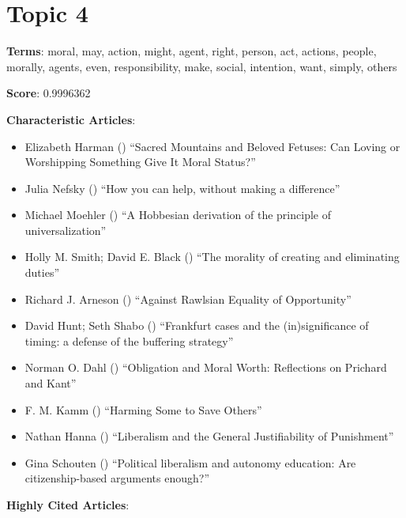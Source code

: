 \documentclass[
  10pt,
  letterpaper,
  DIV=11,
  numbers=noendperiod,
  twoside]{scrartcl}
\providecommand{\tightlist}{%
  \setlength{\itemsep}{0pt}\setlength{\parskip}{0pt}}\usepackage{longtable,booktabs,array}
\begin{document}
\section{Topic 4}\label{topic-4}

\textbf{Terms}: moral, may, action, might, agent, right, person, act,
actions, people, morally, agents, even, responsibility, make, social,
intention, want, simply, others

\textbf{Score}: 0.9996362

\textbf{Characteristic Articles}:

\begin{itemize}
\tightlist
\item
  Elizabeth Harman () ``Sacred
  Mountains and Beloved Fetuses: Can Loving or Worshipping Something
  Give It Moral Status?''
\item
  Julia Nefsky () ``How you can
  help, without making a difference''
\item
  Michael Moehler () ``A
  Hobbesian derivation of the principle of universalization''
\item
  Holly M. Smith; David E. Black
  () ``The morality of creating
  and eliminating duties''
\item
  Richard J. Arneson () ``Against
  Rawlsian Equality of Opportunity''
\item
  David Hunt; Seth Shabo ()
  ``Frankfurt cases and the (in)significance of timing: a defense of the
  buffering strategy''
\item
  Norman O. Dahl () ``Obligation
  and Moral Worth: Reflections on Prichard and Kant''
\item
  F. M. Kamm () ``Harming Some to
  Save Others''
\item
  Nathan Hanna () ``Liberalism
  and the General Justifiability of Punishment''
\item
  Gina Schouten () ``Political
  liberalism and autonomy education: Are citizenship-based arguments
  enough?''
\end{itemize}

\textbf{Highly Cited Articles}:
\end{document}

